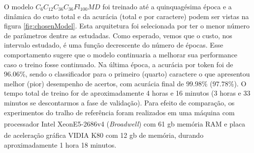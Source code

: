 O modelo $C_6C_{12}C_{36}C_{36}Fl_{100}MD$ foi treinado até a quinquagésima época e a dinâmica do custo total e da acurácia (total e por caractere) podem ser vistas na figura \ref{fig:chosenModel}. Esta arquitetura foi selecionada por ter o menor número de parâmetros dentre as estudadas. Como esperado, vemos que o custo, nos intervalo estudado, é uma função decrescente do número de épocas. Esse comportamento sugere que o modelo continuaria a melhorar sua performance caso o treino fosse continuado. Na última época, a acurácia por token foi de $96.06\%$, sendo o classificador para o primeiro (quarto) caractere o que apresentou melhor (pior) desempenho de acertos, com acurácia final de $99.98\%$ ($97.78\%$). O tempo total de treino for de aproximadamente 4 horas e 16 minutos (3 horas e 33 minutos se descontarmos a fase de validação). Para efeito de comparação, os experimentos do tralho de referência foram realizados em uma máquina com processador Intel\textsuperscript{\textregistered} Xeon\texttrademark E5-2686v4 (\textit{Broadwell}) com 61 gb memória RAM e placa de aceleração gráfica VIDIA\textsuperscript{\textregistered} K80 com 12 gb de memória, durando aproximadamente 1 hora 18 minutos.

